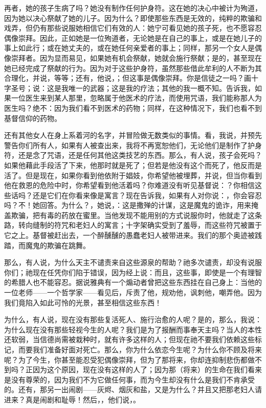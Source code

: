 再者，她的孩子生病了吗？她没有制作任何护身符。这在她的决心中被计为殉道，因为她以决心祭献了她的儿子。因为什么？即使那些东西是无效的，纯粹的欺骗和戏弄，但仍有那些说服她相信它们有效的人：她宁可看见她的孩子死，也不愿容忍偶像崇拜。因此，正如她是一位殉道者，无论她是在自己的事上，或是在她儿子的事上如此行；或在她丈夫的，或在她任何亲爱者的事上；同样，那另一个女人是偶像崇拜者。因为显而易见，如果她有机会祭献，她就会施行祭献；是的，甚至现在她已经完成了祭献的行为。因为对于这些护身符，虽然那些借此牟利的人不断为其合理化，并说，等等；还有，他说，；但这事是偶像崇拜。你是信徒之一吗？画十字圣号；说：这是我唯一的武器；这是我的疗法；其他的我一概不知。告诉我，如果一位医生来到某人那里，忽略属于他医术的疗法，而使用咒语，我们能称那人为医生吗？绝不：因为我们看不到医术的药物；同样，在这种情况下，我们也看不到基督信仰的药物。\par

还有其他女人在身上系着河的名字，并冒险做无数类似的事情。看，我说，并预先警告你们所有人，如果有人被查出来，我将不再宽恕他们，无论他们是制作了护身符，还是念了咒语，还是任何其他这类技艺的东西。那么，有人说，孩子会死吗？如果他藉此手段活了下来，他那时就是死了；但若是他没有这个而死了，他反而是活了。但是现在，如果你看到他依附于娼妓，你希望他被埋葬，并说，但当你看到他在救恩的危险中时，你希望看到他活着吗？你难道没有听见基督说：？你相信这些话吗？还是它们在你看来像是寓言？现在告诉我，如果有人对你说：，你会容忍吗？不！她回答。为什么？，她说，：这是撒殚的计谋，这是魔鬼的诡诈，用来掩盖欺骗，把有毒的药放在蜜里。当他发现不能用别的方式说服你时，他就走了这条路，转向缝制的符咒和老妇人的寓言；十字架确实受到了羞辱，而这些符咒被置于它之上。基督被赶出去，一个醉醺醺的愚蠢老妇人被带进来。我们的那个奥迹被践踏，而魔鬼的欺骗在跳舞。\par

那么，有人说，为什么天主不谴责来自这些源泉的帮助？祂多次谴责，却没有说服你们；祂现在任凭你们陷于错误，因为经上说：而且，这些事，即使是一个有理智的希腊人也不能容忍。据说雅典有一个煽动者曾把这些东西挂在自己身上：当他的一位老师——一个哲学家——看见后，斥责了他，规劝他，讽刺他，嘲弄他。因为我们竟陷入如此可怜的光景，甚至相信这些东西！\par

为什么，有人说，现在没有那些复活死人、施行治愈的人呢？是的，那么，我说：为什么现在没有那些轻视今生的人呢？我们是为了报酬而事奉天主吗？当人的本性还软弱，当信德尚需被栽种时，就有许多这样的人；但现在祂不要我们依赖这些标记，而要我们准备好面对死亡。那么，你为什么依恋今生呢？为什么你不顾及将来呢？为了今生，你甚至能忍受犯偶像崇拜，但为了那将来，你却连抑制悲伤都做不到吗？正因为这个原因，现在没有这样的人了；因为那（将来）的生命在我们看来是没有尊荣的，因为我们不为它做任何事，而为今生却没有什么是我们不肯承受的。还有，那另一出闹剧——灰烬、烟灰和盐，又是为什么？并且又把那老妇人请进来？真是闹剧和耻辱！然后，，他们说，。\par

